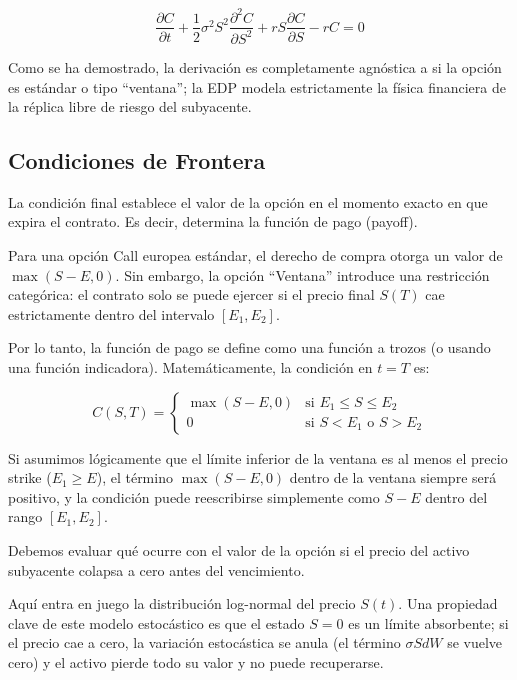 \documentclass[12pt, a4paper]{article}
\begin{document}
\begin{equation}
    \frac{\partial C}{\partial t} + \frac{1}{2} \sigma^2 S^2 \frac{\partial^2 C}{\partial S^2} + r S \frac{\partial C}{\partial S} - r C = 0
\end{equation}

Como se ha demostrado, la derivación es completamente agnóstica a si la opción es estándar o tipo ``ventana''; la EDP modela estrictamente la física financiera de la réplica libre de riesgo del subyacente.

\subsection{Condiciones de Frontera}

La condición final establece el valor de la opción en el momento exacto en que expira el contrato. Es decir, determina la función de pago (payoff).

Para una opción Call europea estándar, el derecho de compra otorga un valor de $\max(S-E, 0)$. Sin embargo, la opción ``Ventana'' introduce una restricción categórica: el contrato solo se puede ejercer si el precio final $S(T)$ cae estrictamente dentro del intervalo $[E_1, E_2]$.

Por lo tanto, la función de pago se define como una función a trozos (o usando una función indicadora). Matemáticamente, la condición en $t=T$ es:

\[ C(S, T) = \begin{cases} \max(S - E, 0) & \text{si } E_1 \leq S \leq E_2 \\ 0 & \text{si } S < E_1 \text{ o } S > E_2 \end{cases} \]

Si asumimos lógicamente que el límite inferior de la ventana es al menos el precio strike ($E_1 \geq E$), el término $\max(S-E, 0)$ dentro de la ventana siempre será positivo, y la condición puede reescribirse simplemente como $S - E$ dentro del rango $[E_1, E_2]$.

Debemos evaluar qué ocurre con el valor de la opción si el precio del activo subyacente colapsa a cero antes del vencimiento.

Aquí entra en juego la distribución log-normal del precio $S(t)$. Una propiedad clave de este modelo estocástico es que el estado $S=0$ es un límite absorbente; si el precio cae a cero, la variación estocástica se anula (el término $\sigma S dW$ se vuelve cero) y el activo pierde todo su valor y no puede recuperarse.
\end{document}
